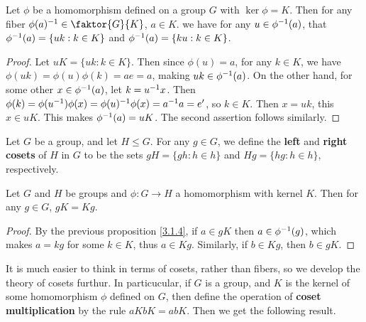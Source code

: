 \begin{proposition}\label{proposition_3.1.4}
  Let $\phi$ be a homomorphism defined on a group  $G$ with  $\ker{\phi}=K$.
  Then for any fiber $\inv{\phi(a)} \in \faktor{G}{K}$, $a \in K$. we have
  for any $u \in \phi^{-1}(a)$, that $\phi^{-1}(a)=\{uk : k \in K\}$ and
  $\phi^{-1}(a)=\{ku : k \in K\}$.
\end{proposition}
\begin{proof}
  Let $uK=\{uk : k \in K\}$. Then since $\phi(u)=a$, for any $k \in K$, we
  have  $\phi(uk)=\phi(u)\phi(k)=ae=a$, making $uk \in \phi^{-1}(a)$. On the
  other hand, for some other $x \in \phi^{-1}(a)$, let $k=u^{-1}x$. Then
  $\phi(k)=\phi(u^{-1})\phi(x)=\phi(u)^{-1}\phi(x)=a^{-1}a=e'$, so $k \in
  K$. Then  $x=uk$, this  $x \in uK$. This makes  $\phi^{-1}(a)=uK$. The
  second assertion follows similarly.
\end{proof}

\begin{definition}
  Let $G$ be a group, and let  $H \leq G$. For any  $g \in G$, we define the
  \textbf{left} and \textbf{right cosets} of $H$ in $G$ to be the sets
  $gH=\{gh : h \in h\}$ and $Hg=\{hg : h \in h\}$, respectively.
\end{definition}

\begin{proposition}\label{proposition_3.1.5}
  Let $G$ and  $H$ be groups and  $\phi:G \rightarrow H$ a homomorphism with
  kernel $K$. Then for any  $g \in G$,  $gK=Kg$.
\end{proposition}
\begin{proof}
  By the previous proposition \ref{3.1.4}, if $a \in gK$ then  $a \in \phi^{-1}(g)$,
  which makes $a=kg$ for some  $k \in K$, thus  $a \in Kg$. Similarly, if  $b
  \in Kg$, then  $b \in gK$.
\end{proof}

It is much easier to think in terms of cosets, rather than fibers, so we develop
the theory of cosets furthur. In particucular, if $G$ is a group, and  $K$ is
the kernel of some homomorphism  $\phi$ defined on  $G$, then define the
operation of  \textbf{coset multiplication} by the rule $aKbK=abK$. Then we get
the following result.

